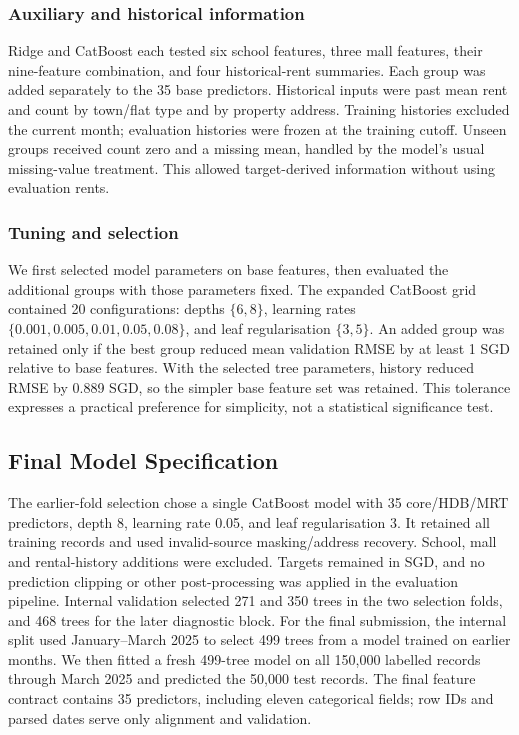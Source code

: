 \documentclass[conference]{IEEEtran}
\begin{document}
\subsubsection{Auxiliary and historical information}
Ridge and CatBoost each tested six school features, three mall features,
their nine-feature combination, and four historical-rent summaries. Each
group was added separately to the 35 base predictors. Historical inputs
were past mean rent and count by town/flat type and by property address.
Training histories excluded the current month; evaluation histories were
frozen at the training cutoff. Unseen groups received count zero and a
missing mean, handled by the model's usual missing-value treatment.
This allowed target-derived information without using evaluation rents.

\subsubsection{Tuning and selection}
We first selected model parameters on base features, then evaluated the
additional groups with those parameters fixed. The expanded CatBoost grid
contained 20 configurations: depths $\{6,8\}$, learning rates
$\{0.001,0.005,0.01,0.05,0.08\}$, and leaf regularisation $\{3,5\}$.
An added group was retained only if the best group reduced mean validation
RMSE by at least 1 SGD relative to base features. With the selected tree
parameters, history reduced RMSE by 0.889 SGD, so the simpler base feature
set was retained. This tolerance expresses a practical preference for
simplicity, not a statistical significance test.

\subsection{Final Model Specification}
\label{sec:finalmodel}
The earlier-fold selection chose a single CatBoost model with
35 core/HDB/MRT predictors, depth 8, learning rate 0.05, and leaf
regularisation 3. It retained all training records and used invalid-source
masking/address recovery. School, mall and rental-history additions were
excluded. Targets remained in SGD, and no prediction clipping or other
post-processing was applied in the evaluation pipeline. Internal validation
selected 271 and 350 trees in the two selection folds, and 468 trees for
the later diagnostic block. For the final submission, the internal split
used January--March 2025 to select 499 trees from a model trained on earlier
months. We then fitted a fresh 499-tree model on all 150,000 labelled
records through March 2025 and predicted the 50,000 test records. The final
feature contract contains 35 predictors, including eleven categorical
fields; row IDs and parsed dates serve only alignment and validation.
\end{document}
